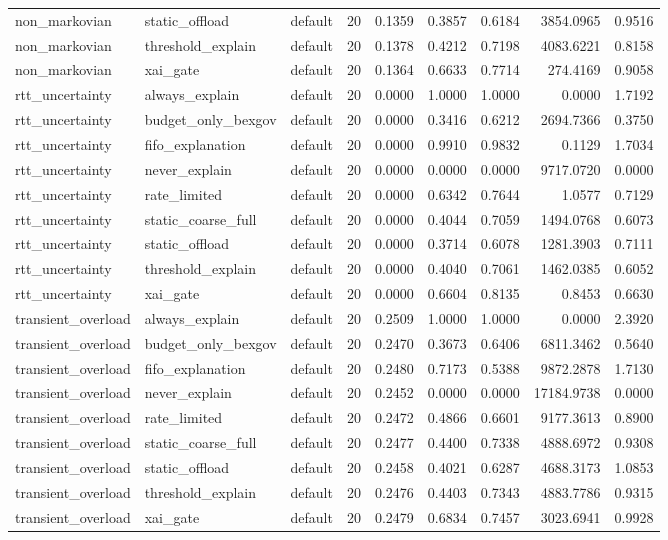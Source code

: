 \begin{table}[t]
\begin{tabular}{lllrrrrrr}
non\_markovian & static\_offload & default & 20 & 0.1359 & 0.3857 & 0.6184 & 3854.0965 & 0.9516 \\
non\_markovian & threshold\_explain & default & 20 & 0.1378 & 0.4212 & 0.7198 & 4083.6221 & 0.8158 \\
non\_markovian & xai\_gate & default & 20 & 0.1364 & 0.6633 & 0.7714 & 274.4169 & 0.9058 \\
rtt\_uncertainty & always\_explain & default & 20 & 0.0000 & 1.0000 & 1.0000 & 0.0000 & 1.7192 \\
rtt\_uncertainty & budget\_only\_bexgov & default & 20 & 0.0000 & 0.3416 & 0.6212 & 2694.7366 & 0.3750 \\
rtt\_uncertainty & fifo\_explanation & default & 20 & 0.0000 & 0.9910 & 0.9832 & 0.1129 & 1.7034 \\
rtt\_uncertainty & never\_explain & default & 20 & 0.0000 & 0.0000 & 0.0000 & 9717.0720 & 0.0000 \\
rtt\_uncertainty & rate\_limited & default & 20 & 0.0000 & 0.6342 & 0.7644 & 1.0577 & 0.7129 \\
rtt\_uncertainty & static\_coarse\_full & default & 20 & 0.0000 & 0.4044 & 0.7059 & 1494.0768 & 0.6073 \\
rtt\_uncertainty & static\_offload & default & 20 & 0.0000 & 0.3714 & 0.6078 & 1281.3903 & 0.7111 \\
rtt\_uncertainty & threshold\_explain & default & 20 & 0.0000 & 0.4040 & 0.7061 & 1462.0385 & 0.6052 \\
rtt\_uncertainty & xai\_gate & default & 20 & 0.0000 & 0.6604 & 0.8135 & 0.8453 & 0.6630 \\
transient\_overload & always\_explain & default & 20 & 0.2509 & 1.0000 & 1.0000 & 0.0000 & 2.3920 \\
transient\_overload & budget\_only\_bexgov & default & 20 & 0.2470 & 0.3673 & 0.6406 & 6811.3462 & 0.5640 \\
transient\_overload & fifo\_explanation & default & 20 & 0.2480 & 0.7173 & 0.5388 & 9872.2878 & 1.7130 \\
transient\_overload & never\_explain & default & 20 & 0.2452 & 0.0000 & 0.0000 & 17184.9738 & 0.0000 \\
transient\_overload & rate\_limited & default & 20 & 0.2472 & 0.4866 & 0.6601 & 9177.3613 & 0.8900 \\
transient\_overload & static\_coarse\_full & default & 20 & 0.2477 & 0.4400 & 0.7338 & 4888.6972 & 0.9308 \\
transient\_overload & static\_offload & default & 20 & 0.2458 & 0.4021 & 0.6287 & 4688.3173 & 1.0853 \\
transient\_overload & threshold\_explain & default & 20 & 0.2476 & 0.4403 & 0.7343 & 4883.7786 & 0.9315 \\
transient\_overload & xai\_gate & default & 20 & 0.2479 & 0.6834 & 0.7457 & 3023.6941 & 0.9928 \\
\bottomrule
\end{tabular}
\end{table}
